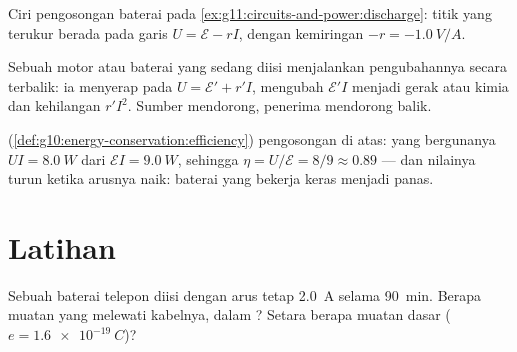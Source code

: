 \begin{omfigure}

{\small Ciri pengosongan baterai pada
\cref{ex:g11:circuits-and-power:discharge}: titik yang terukur berada
pada garis $U = \mathcal{E} - rI$, dengan kemiringan
$-r = \qty{-1.0}{V/A}$.}
\end{omfigure}

\begin{remark}[Penerima]\label{rem:g11:circuits-and-power:receivers}
Sebuah motor atau baterai yang sedang diisi menjalankan pengubahannya
secara terbalik: ia menyerap pada $U = \mathcal{E}' + r'I$, mengubah
$\mathcal{E}'I$ menjadi gerak atau kimia dan kehilangan $r'I^2$. Sumber
mendorong, penerima mendorong balik.
\end{remark}

\begin{example}\label{ex:g11:circuits-and-power:efficiency}
 (\cref{def:g10:energy-conservation:efficiency}) pengosongan di
atas: yang bergunanya $UI = \qty{8.0}{W}$ dari $\mathcal{E}I =
\qty{9.0}{W}$, sehingga $\eta = U/\mathcal{E} = 8/9 \approx 0.89$ ---
dan nilainya turun ketika arusnya naik: baterai yang bekerja keras
menjadi panas.
\end{example}

\section{Latihan}

\begin{exercise}[$\star$]\label{exo:g11:circuits-and-power:1}
Sebuah baterai telepon diisi dengan arus tetap \qty{2.0}{A} selama
\qty{90}{min}. Berapa muatan yang melewati kabelnya, dalam ?
Setara berapa muatan dasar ($e = \qty{1.6e-19}{C}$)?
\end{exercise}

